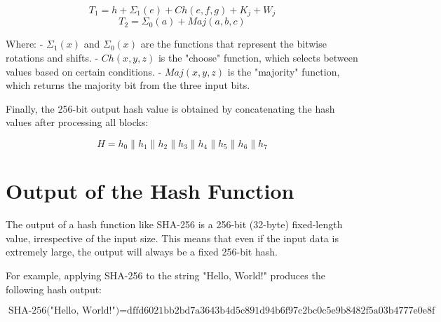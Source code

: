 \[
T_1 = h + \Sigma_1(e) + Ch(e,f,g) + K_j + W_j
\]
\[
T_2 = \Sigma_0(a) + Maj(a,b,c)
\]

Where:
- \( \Sigma_1(x) \) and \( \Sigma_0(x) \) are the functions that represent the bitwise rotations and shifts.
- \( Ch(x, y, z) \) is the "choose" function, which selects between values based on certain conditions.
- \( Maj(x, y, z) \) is the "majority" function, which returns the majority bit from the three input bits.

Finally, the 256-bit output hash value is obtained by concatenating the hash values after processing all blocks:

\[
H = h_0 \parallel h_1 \parallel h_2 \parallel h_3 \parallel h_4 \parallel h_5 \parallel h_6 \parallel h_7
\]

\section*{Output of the Hash Function}

The output of a hash function like SHA-256 is a 256-bit (32-byte) fixed-length value, irrespective of the input size. This means that even if the input data is extremely large, the output will always be a fixed 256-bit hash.

For example, applying SHA-256 to the string "Hello, World!" produces the following hash output:

\[
\text{SHA-256("Hello, World!")} = \text{dffd6021bb2bd7a3643b4d5c891d94b6f97c2bc0c5e9b8482f5a03b4777e0e8f}
\]